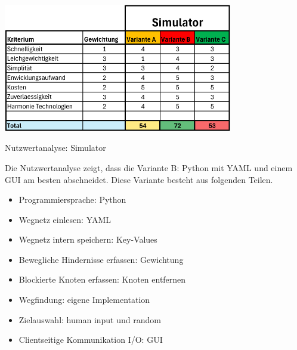 \begin{table}[H]
\centering
\includegraphics[width=0.75\textwidth]{assets/Nutzwertanalyse-Simulator.pdf}
\caption{Nutzwertanalyse: Simulator}
\label{table:nutzwert-Simulator}
\end{table}

Die Nutzwertanalyse zeigt, dass die Variante B: Python mit YAML und einem GUI am besten abschneidet. Diese Variante besteht aus folgenden Teilen.

\begin{itemize}
    \item Programmiersprache: Python
    \item Wegnetz einlesen: YAML
    \item Wegnetz intern speichern: Key-Values
    \item Bewegliche Hindernisse erfassen: Gewichtung
    \item Blockierte Knoten erfassen: Knoten entfernen
    \item Wegfindung: eigene Implementation
    \item Zielauswahl: human input und random
    \item Clientseitige Kommunikation I/O: GUI
\end{itemize}